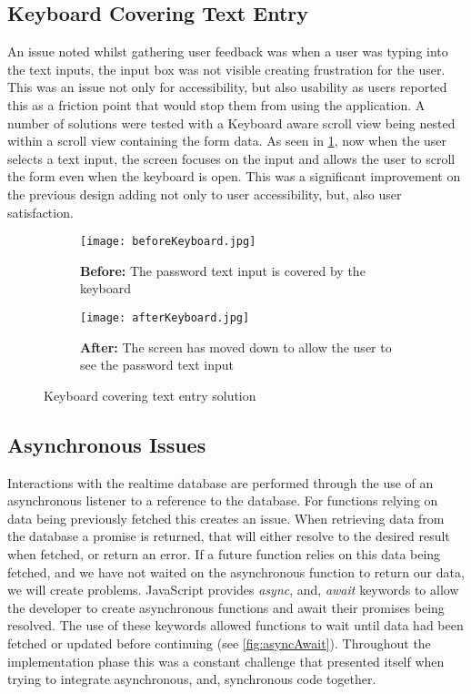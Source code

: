 \subsection*{Keyboard Covering Text Entry}
An issue noted whilst gathering user feedback was when a user was typing into the text inputs, the input box was not visible creating frustration for the user. This was an issue not only for accessibility, but also usability as users reported this as a friction point that would stop them from using the application. A number of solutions were tested with a Keyboard aware scroll view being nested within a scroll view containing the form data. As seen in \ref{fig:keyboard}, now when the user selects a text input, the screen focuses on the input and allows the user to scroll the form even when the keyboard is open. This was a significant improvement on the previous design adding not only to user accessibility, but, also user satisfaction.
\begin{figure}[!htbp]
    \centering
    \begin{subfigure}[b]{0.25\textwidth}
        \texttt{[image: beforeKeyboard.jpg]}
        \caption{\textbf{Before:} The password text input is covered by the keyboard}
    \end{subfigure}
    \hspace{1.5em}
    \begin{subfigure}[b]{0.25\textwidth}
        \texttt{[image: afterKeyboard.jpg]}
        \caption{\textbf{After:} The screen has moved down to  allow  the user to see the password text input}
    \end{subfigure}
    \caption{Keyboard covering text entry solution }
    \label{fig:keyboard}
\end{figure}


\subsection*{Asynchronous Issues}
Interactions with the realtime database are performed through the use of an asynchronous listener to a reference to the database. For functions relying on data being previously fetched this creates an issue. When retrieving data from the database a promise is returned, that will either resolve to the desired result when fetched, or return an error. If a future function relies on this data being fetched, and we have not waited on the asynchronous function to return our data, we will create problems. JavaScript provides \textit{async}, and, \textit{await} keywords to allow the developer to create asynchronous functions and await their promises being resolved. The use of these keywords allowed functions to wait until data had been fetched or updated before continuing (see \ref{fig:asyncAwait}). Throughout the implementation phase this was a constant challenge that presented itself when trying to integrate asynchronous, and, synchronous code together.

